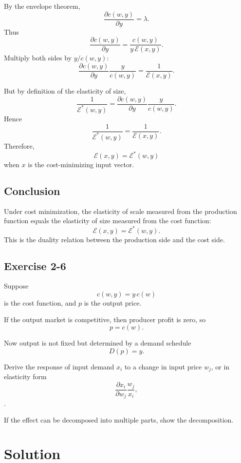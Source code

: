 By the envelope theorem,
\[
\frac{\partial c(w,y)}{\partial y}=\lambda.
\]
Thus
\[
\frac{\partial c(w,y)}{\partial y}
=
\frac{c(w,y)}{y\,\mathcal E(x,y)}.
\]
Multiply both sides by \(y/c(w,y)\):
\[
\frac{\partial c(w,y)}{\partial y}\frac{y}{c(w,y)}
=
\frac{1}{\mathcal E(x,y)}.
\]

But by definition of the elasticity of size,
\[
\frac{1}{\mathcal E^*(w,y)}
=
\frac{\partial c(w,y)}{\partial y}\frac{y}{c(w,y)}.
\]
Hence
\[
\frac{1}{\mathcal E^*(w,y)}=\frac{1}{\mathcal E(x,y)}.
\]
Therefore,
\[
\boxed{
\mathcal E(x,y)=\mathcal E^*(w,y)
}
\]
when \(x\) is the cost-minimizing input vector.

\subsection*{Conclusion}

Under cost minimization, the elasticity of scale measured from the production function equals the elasticity of size measured from the cost function:
\[
\boxed{
\mathcal E(x,y)=\mathcal E^*(w,y).
}
\]
This is the duality relation between the production side and the cost side.



\vspace{30pt}
\begin{tcolorbox}[breakable]

\subsection*{Exercise 2-6}

Suppose
\[
c(w,y)=y\,c(w)
\]
is the cost function, and $p$ is the output price.

If the output market is competitive, then producer profit is zero, so
\[
p=c(w).
\]

Now output is not fixed but determined by a demand schedule
\[
D(p)=y.
\]

Derive the response of input demand $x_i$ to a change in input price $w_j$,
or in elasticity form
\[
\frac{\partial x_i}{\partial w_j} \frac{w_j}{x_i},
\].

If the effect can be decomposed into multiple parts, show the decomposition.

\end{tcolorbox}


\section*{Solution}

